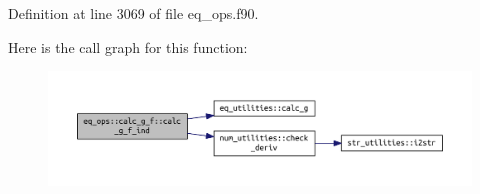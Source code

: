 Definition at line 3069 of file eq\+\_\+ops.\+f90.

Here is the call graph for this function\+:\nopagebreak
\begin{figure}[H]
\begin{center}
\leavevmode
\includegraphics[width=350pt]{interfaceeq__ops_1_1calc__g__f_a2c6ba8f85bc6ab16e69d4ec2ccaa317a_cgraph}
\end{center}
\end{figure}


